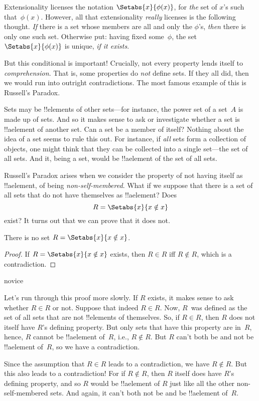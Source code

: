 \documentclass[../../../include/open-logic-section]{subfiles}
\begin{document}

Extensionality licenses the notation $\Setabs{x}{\phi(x)}$, for
\emph{the} set of $x$'s such that~$\phi(x)$. However, all that
extensionality \emph{really} licenses is the following thought.
\emph{If} there is a set whose members are all and only the $\phi$'s,
\emph{then} there is only one such set. Otherwise put: having fixed
some~$\phi$, the set $\Setabs{x}{\phi(x)}$ is unique, \emph{if it
exists}.

But this conditional is important!{} Crucially, not every property
lends itself to \emph{comprehension}. That is, some  properties do
\emph{not} define sets. If they all did, then we would run into
outright contradictions. The most famous example of this is Russell's
Paradox.

Sets may be !!{element}s of other sets---for instance, the power set
of a set~$A$ is made up of sets. And so it makes sense to ask or
investigate whether a set is !!a{element} of another set. Can a set be
a member of itself?  Nothing about the idea of a set seems to rule
this out. For instance, if \emph{all} sets form a collection of
objects, one might think that they can be collected into a single
set---the set of all sets. And it, being a set, would be !!a{element}
of the set of all sets. 

Russell's Paradox arises when we consider the property of not having
itself as !!a{element}, of being \emph{non-self-membered}. What if we
suppose that there is a set of all sets that do not have themselves as
!!a{element}? Does
\[
R = \Setabs{x}{x \notin x}
\]
exist? It turns out that we can prove that it does not.

\begin{thm}
	There is no set $R = \Setabs{x}{x \notin x}$.
\end{thm}

\begin{proof}
If $R = \Setabs{x}{x \notin x}$ exists, then
$R \in R$ iff $R \notin R$, which is a contradiction.
\end{proof}

\begin{tagblock}{novice}
\begin{explain}
Let's run through this proof more slowly. If $R$ exists, it makes sense to ask whether $R \in
R$ or not. Suppose that indeed $R \in R$. Now, $R$~was defined as the set of all
sets that are not !!{element}s of themselves. So, if $R \in R$,
then $R$ does not itself have $R$'s defining property. But only sets
that have this property are in~$R$, hence, $R$ cannot be !!a{element}
of~$R$, i.e., $R \notin R$. But $R$ can't both be and not be
!!a{element} of~$R$, so we have a contradiction.

Since the assumption that $R \in R$ leads to a contradiction, we have
$R \notin R$. But this also leads to a contradiction!{} For if $R
\notin R$, then $R$ itself does have $R$'s defining property, and so $R$ would be
!!a{element} of $R$ just like all the other non-self-membered sets.
And again, it can't both not be and be !!a{element} of~$R$.
\end{explain}
\end{tagblock}
\end{document}
